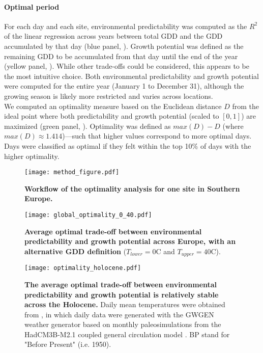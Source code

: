 \documentclass[11pt,letter]{article}
\begin{document}
\paragraph{Optimal period} For each day and each site, environmental predictability was computed as the $R^2$ of the linear regression across years between total GDD and the GDD accumulated by that day (blue panel, ). Growth potential was defined as the remaining GDD to be accumulated from that day until the end of the year (yellow panel, ). While other trade-offs could be considered, this appears to be the most intuitive choice. Both environmental predictability and growth potential were computed for the entire year (January 1 to December 31), although the growing season is likely more restricted and varies across locations. \\
We computed an optimality measure based on the Euclidean distance $D$ from  the ideal point where both predictability and growth potential (scaled to $[0,1]$) are maximized (green panel, ). Optimality was defined as $max(D)-D$ (where $max(D)\approx1.414$)---such that higher values correspond to more optimal days. Days were classified as optimal if they felt within the top 10\% of days with the higher optimality.

\begin{figure}[hb]
\hspace*{-1.4cm}
\texttt{[image: method\_figure.pdf]}
\vspace*{-0.4cm}
\caption{\textbf{Workflow of the optimality analysis for one site in Southern Europe.}}
\label{fig:method}
\end{figure}

\clearpage

\begin{figure}[h]
\centering
\texttt{[image: global\_optimality\_0\_40.pdf]}
\vspace*{-0.4cm}
\caption{\textbf{Average optimal trade-off between environmental predictability and growth potential across Europe, with an alternative GDD definition} ($T_{lower}=0$\degree C and $T_{upper}=40$\degree C).}
\label{fig:altgdd}
\end{figure}

\begin{figure}[h]
\hspace*{-1.2cm}
\texttt{[image: optimality\_holocene.pdf]}
\vspace*{-1cm}
\caption{\textbf{The average optimal trade-off between environmental predictability and growth potential is relatively stable across the Holocene.} Daily mean temperatures were obtained from \citet{VanderMeersch2024}, in which daily data were generated with the GWGEN weather generator \citep{Sommer2017} based on monthly paleosimulations from the HadCM3B-M2.1 coupled general circulation model \citep{Armstrong2019}. BP stand for "Before Present" (i.e. 1950).}
\label{fig:holocene}
\end{figure}
\end{document}
